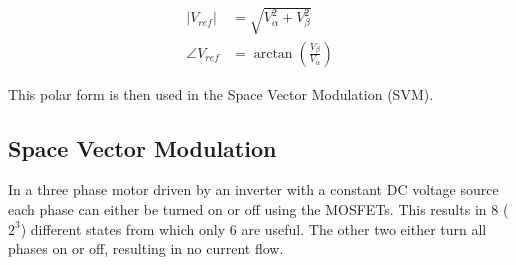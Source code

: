 \documentclass[]{report}
\begin{document}
\begin{equation} \label{eq:AlphaBetaToPolar}
	\begin{split}
		\lvert V_{ref} \rvert &= \sqrt{V_{\alpha}^2 + V_{\beta}^2} \\
		\angle V_{ref} &= \arctan{\left( \frac{V_{\beta}}{V_{\alpha}} \right)} 
	\end{split}
\end{equation}

This polar form is then used in the Space Vector Modulation (SVM).

\subsection{Space Vector Modulation}
In a three phase motor driven by an inverter with a constant DC voltage source each phase can either be turned on or off using the MOSFETs. This results in 8 ($2^3$) different states from which only 6 are useful. The other two either turn all phases on or off, resulting in no current flow.
\end{document}
